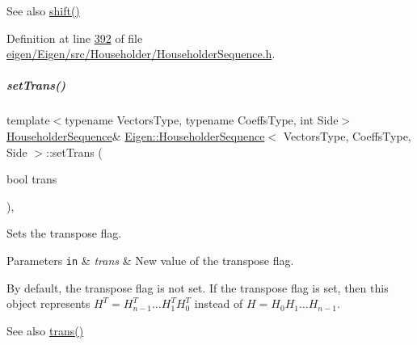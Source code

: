 \begin{DoxySeeAlso}{See also}
\hyperlink{group___householder___module_a34482bfad5563fd8a8a4264db76ac917}{shift()} 
\end{DoxySeeAlso}


Definition at line \hyperlink{eigen_2_eigen_2src_2_householder_2_householder_sequence_8h_source_l00392}{392} of file \hyperlink{eigen_2_eigen_2src_2_householder_2_householder_sequence_8h_source}{eigen/\+Eigen/src/\+Householder/\+Householder\+Sequence.\+h}.

\mbox{\label{group___householder___module_ab8a9c969a9adcd392c9d481d6e9ccaef}} 
\subparagraph{\texorpdfstring{set\+Trans()}{setTrans()}\hspace{0.1cm}{\footnotesize\ttfamily [1/2]}}
{\footnotesize\ttfamily template$<$typename Vectors\+Type, typename Coeffs\+Type, int Side$>$ \\
\hyperlink{group___householder___module_class_eigen_1_1_householder_sequence}{Householder\+Sequence}\& \hyperlink{group___householder___module_class_eigen_1_1_householder_sequence}{Eigen\+::\+Householder\+Sequence}$<$ Vectors\+Type, Coeffs\+Type, Side $>$\+::set\+Trans (\begin{DoxyParamCaption}\item[{bool}]{trans }\end{DoxyParamCaption})\hspace{0.3cm}{\ttfamily [inline]}, {\ttfamily [protected]}}



Sets the transpose flag. 


\begin{DoxyParams}[1]{Parameters}
\mbox{\tt in}  & {\em trans} & New value of the transpose flag.\\
\hline
\end{DoxyParams}
By default, the transpose flag is not set. If the transpose flag is set, then this object represents $ H^T = H_{n-1}^T \ldots H_1^T H_0^T $ instead of $ H = H_0 H_1 \ldots H_{n-1} $.

\begin{DoxySeeAlso}{See also}
\hyperlink{group___householder___module_ad61c9b10d95c26b7397ccb47f4d80b08}{trans()} 
\end{DoxySeeAlso}


